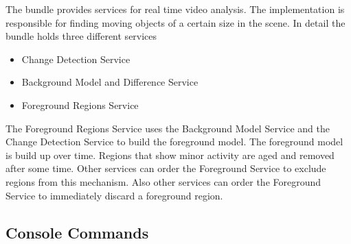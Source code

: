 
The bundle provides services for real time video analysis. The implementation is responsible for finding moving objects of a certain size in the scene. In detail the bundle holds three different services

\begin{itemize}
 \item Change Detection Service
 \item Background Model and Difference Service
 \item Foreground Regions Service
\end{itemize}

The Foreground Regions Service uses the Background Model Service and the Change Detection Service to build the foreground model. The foreground model is build up over time. Regions that show minor activity are aged and removed after some time. Other services can order the Foreground Service to exclude regions from this mechanism. Also other services can order the Foreground Service to immediately discard a foreground region.


\subsection{Console Commands}

